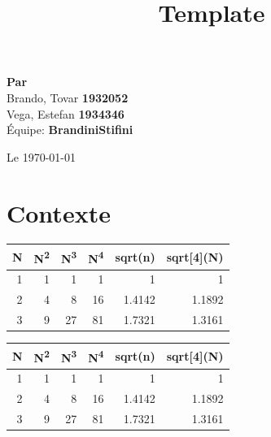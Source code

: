 \documentclass[14pt]{extarticle}
\date{}
\title{Template}
\begin{document}
\begin{ctitlepage}




\vspace{.1in}

\textbf{Par} \\
Brando, Tovar \textbf{1932052} \\
Vega, Estefan \textbf{1934346} \\
Équipe: \textbf{BrandiniStifini} \\

\vspace{.5in}

Le \today

\end{ctitlepage}

\newpage
\tableofcontents
\newpage


\section{Contexte}
\label{sec:org8ff3d3d}
\begin{minipage}{.5\textwidth}
\begin{center}
\begin{tabular}{|r|rrr|rr|}
\hline
N & N\textsuperscript{2} & N\textsuperscript{3} & N\textsuperscript{4} & sqrt(n) & sqrt[4](N)\\
\hline
1 & 1 & 1 & 1 & 1 & 1\\
2 & 4 & 8 & 16 & 1.4142 & 1.1892\\
3 & 9 & 27 & 81 & 1.7321 & 1.3161\\
\hline
\end{tabular}
\end{center}
\vspace*{-5mm}
\label{tbl:table1}
\end{minipage}
\begin{minipage}{.5\textwidth}
\begin{center}
\begin{tabular}{|r|rrr|rr|}
\hline
N & N\textsuperscript{2} & N\textsuperscript{3} & N\textsuperscript{4} & sqrt(n) & sqrt[4](N)\\
\hline
1 & 1 & 1 & 1 & 1 & 1\\
2 & 4 & 8 & 16 & 1.4142 & 1.1892\\
3 & 9 & 27 & 81 & 1.7321 & 1.3161\\
\hline
\end{tabular}
\end{center}
\vspace*{-5mm}
\label{tbl:table2}
\end{minipage}
\end{document}
